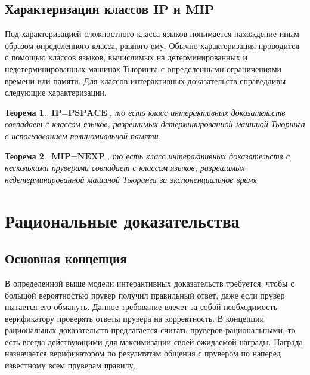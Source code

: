 \documentclass[14pt, a4paper]{extreport}
\newtheorem{theorem}{\indent Теорема}
\begin{document}
\section{Характеризации классов $\textbf{IP}$ и $\textbf{MIP}$}
Под характеризацией сложностного класса языков понимается нахождение иным образом определенного класса, равного ему. Обычно характеризация проводится с помощью классов языков, вычислимых на детерминированных и недетерминированных машинах Тьюринга с определенными ограничениями времени или памяти. Для классов интерактивных доказательств справедливы следующие характеризации.
\begin{theorem}$\textbf{IP} = \textbf{PSPACE}$, то есть класс интерактивных доказательств совпадает с классом языков, разрешимых детерминированной машиной Тьюринга с использованием полиномиальной памяти. \cite{shamir1992ip}
\end{theorem}
\begin{theorem}$\textbf{MIP} = \textbf{NEXP}$, то есть класс интерактивных доказательств с несколькими пруверами совпадает с классом языков, разрешимых недетерминированной машиной Тьюринга за экспоненциальное время \cite{babai1991mip}\end{theorem}

\chapter{Рациональные доказательства}
\section{Основная концепция}
В определенной выше модели интерактивных доказательств требуется, чтобы с большой вероятностью прувер получил правильный ответ, даже если прувер пытается его обмануть. Данное требование влечет за собой необходимость верификатору проверять ответы прувера на корректность. В концепции рациональных доказательств предлагается считать пруверов рациональными, то есть всегда действующими для максимизации своей ожидаемой награды. Награда назначается верификатором по результатам общения с прувером по наперед известному всем пруверам правилу. 
\end{document}
